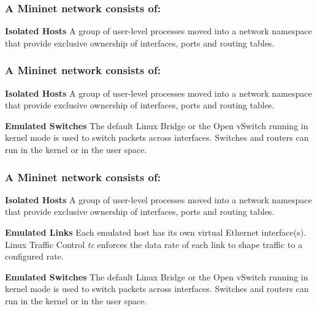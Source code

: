 \documentclass{beamer}
\begin{document}
\begin{frame}
  \frametitle{A Mininet network consists of:}

  \begin{block}{\textbf{Isolated Hosts}} 
    A group of user-level processes moved into a network namespace
    that provide exclusive ownership of interfaces, ports and routing
    tables.
  \end{block}

\end{frame}
\begin{frame}
  \frametitle{A Mininet network consists of:}

  \begin{block}{\textbf{Isolated Hosts}} 
    A group of user-level processes moved into a network namespace
    that provide exclusive ownership of interfaces, ports and routing
    tables.
  \end{block}
  \begin{block}{\textbf{Emulated Switches}} 
    The default Linux Bridge or the Open vSwitch running in kernel
    mode is used to switch packets across interfaces. Switches and
    routers can run in the kernel or in the user space.
  \end{block}

\end{frame}
\begin{frame}
  \frametitle{A Mininet network consists of:}

  \begin{block}{\textbf{Isolated Hosts}} 
    A group of user-level processes moved into a network namespace
    that provide exclusive ownership of interfaces, ports and routing
    tables.
  \end{block}
  \begin{block}{\textbf{Emulated Links}} 
    Each emulated host has its own virtual Ethernet interface(s).
    Linux Traffic Control \textit{tc} enforces the data rate of each link
    to shape traffic to a configured rate.
  \end{block}
  \begin{block}{\textbf{Emulated Switches}} 
    The default Linux Bridge or the Open vSwitch running in kernel
    mode is used to switch packets across interfaces. Switches and
    routers can run in the kernel or in the user space.
  \end{block}

\end{frame}
\end{document}
